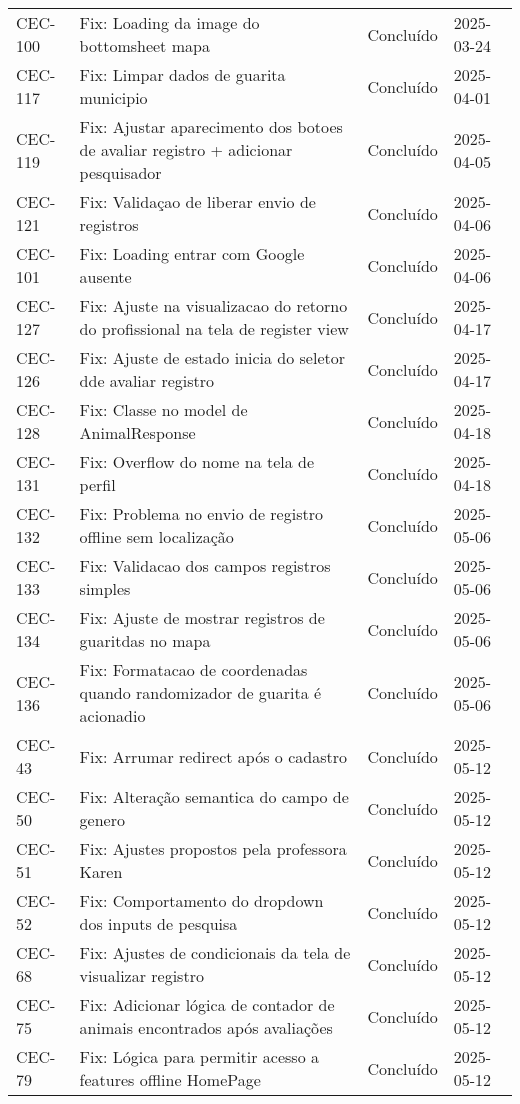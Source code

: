 \begin{longtable}{@{}lp{7cm}ll@{}}
CEC-100 & Fix: Loading da image do bottomsheet mapa & Concluído & 2025-03-24 \\
CEC-117 & Fix: Limpar dados de guarita municipio & Concluído & 2025-04-01 \\
CEC-119 & Fix: Ajustar aparecimento dos botoes de avaliar registro + adicionar pesquisador & Concluído & 2025-04-05 \\
CEC-121 & Fix: Validaçao de liberar envio de registros & Concluído & 2025-04-06 \\
CEC-101 & Fix: Loading entrar com Google ausente & Concluído & 2025-04-06 \\
CEC-127 & Fix: Ajuste na visualizacao do retorno do profissional na tela de register view & Concluído & 2025-04-17 \\
CEC-126 & Fix: Ajuste de estado inicia do seletor dde avaliar registro & Concluído & 2025-04-17 \\
CEC-128 & Fix: Classe no model de AnimalResponse & Concluído & 2025-04-18 \\
CEC-131 & Fix: Overflow do nome na tela de perfil & Concluído & 2025-04-18 \\
CEC-132 & Fix: Problema no envio de registro offline sem localização & Concluído & 2025-05-06 \\
CEC-133 & Fix: Validacao dos campos registros simples & Concluído & 2025-05-06 \\
CEC-134 & Fix: Ajuste de mostrar registros de guaritdas no mapa & Concluído & 2025-05-06 \\
CEC-136 & Fix: Formatacao de coordenadas quando randomizador de guarita é acionadio & Concluído & 2025-05-06 \\
CEC-43 & Fix: Arrumar redirect após o cadastro & Concluído & 2025-05-12 \\
CEC-50 & Fix: Alteração semantica do campo de genero & Concluído & 2025-05-12 \\
CEC-51 & Fix: Ajustes propostos pela professora Karen & Concluído & 2025-05-12 \\
CEC-52 & Fix: Comportamento do dropdown dos inputs de pesquisa & Concluído & 2025-05-12 \\
CEC-68 & Fix: Ajustes de condicionais da tela de visualizar registro & Concluído & 2025-05-12 \\
CEC-75 & Fix: Adicionar lógica de contador de animais encontrados após avaliações & Concluído & 2025-05-12 \\
CEC-79 & Fix: Lógica para permitir acesso a features offline HomePage & Concluído & 2025-05-12 \\

\end{longtable}
